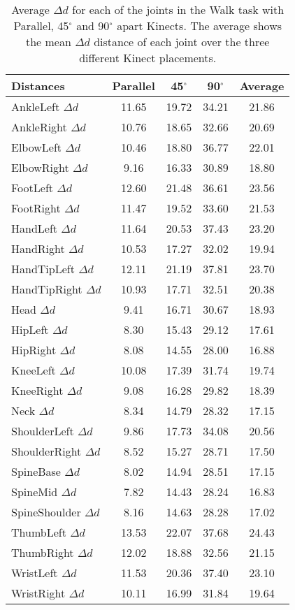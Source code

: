 \begin{table}[!htb]
\centering
\begin{tabularx}{1.0\columnwidth}{||X c c c c||} 
 \hline
 \textbf{Distances} & \textbf{Parallel} & \textbf{45$^{\circ}$} & \textbf{90$^{\circ}$} & \textbf{Average} \\ [0.5ex] 
 \hline\hline
 AnkleLeft $\Delta d$ & 11.65 & 19.72 & 34.21 & 21.86 \\
 \hline
 AnkleRight $\Delta d$ & 10.76 & 18.65 & 32.66 & 20.69 \\
 \hline
 ElbowLeft $\Delta d$ & 10.46 & 18.80 & 36.77 & 22.01 \\
 \hline
 ElbowRight $\Delta d$ & 9.16 & 16.33 & 30.89 & 18.80 \\
 \hline
 FootLeft $\Delta d$ & 12.60 & 21.48 & 36.61 & 23.56 \\
 \hline
 FootRight $\Delta d$ & 11.47 & 19.52 & 33.60 & 21.53 \\
 \hline
 HandLeft $\Delta d$ & 11.64 & 20.53 & 37.43 & 23.20 \\
 \hline
 HandRight $\Delta d$ & 10.53 & 17.27 & 32.02 & 19.94 \\
 \hline
 HandTipLeft $\Delta d$ & 12.11 & 21.19 & 37.81 & 23.70 \\
 \hline
 HandTipRight $\Delta d$ & 10.93 & 17.71 & 32.51 & 20.38 \\
 \hline
 Head $\Delta d$ & 9.41 & 16.71 & 30.67 & 18.93 \\
 \hline
 HipLeft $\Delta d$ & 8.30 & 15.43 & 29.12 & 17.61 \\
 \hline
 HipRight $\Delta d$ & 8.08 & 14.55 & 28.00 & 16.88 \\
 \hline
 KneeLeft $\Delta d$ & 10.08 & 17.39 & 31.74 & 19.74 \\
 \hline
 KneeRight $\Delta d$ & 9.08 & 16.28 & 29.82 & 18.39 \\
 \hline
 Neck $\Delta d$ & 8.34 & 14.79 & 28.32 & 17.15 \\
 \hline
 ShoulderLeft $\Delta d$ & 9.86 & 17.73 & 34.08 & 20.56 \\
 \hline
 ShoulderRight $\Delta d$ & 8.52 & 15.27 & 28.71 & 17.50 \\
 \hline
 SpineBase $\Delta d$ & 8.02 & 14.94 & 28.51 & 17.15 \\
 \hline
 SpineMid $\Delta d$ & 7.82 & 14.43 & 28.24 & 16.83 \\
 \hline
 SpineShoulder $\Delta d$ & 8.16 & 14.63 & 28.28 & 17.02 \\
 \hline
 ThumbLeft $\Delta d$ & 13.53 & 22.07 & 37.68 & 24.43 \\
 \hline
 ThumbRight $\Delta d$ & 12.02 & 18.88 & 32.56 & 21.15 \\
 \hline
 WristLeft $\Delta d$ & 11.53 & 20.36 & 37.40 & 23.10 \\
 \hline
 WristRight $\Delta d$ & 10.11 & 16.99 & 31.84 & 19.64 \\
 \hline
\end{tabularx}
\caption{Average $\Delta d$ for each of the joints in the Walk task with Parallel, 45$^{\circ}$ and 90$^{\circ}$ apart Kinects. The average shows the mean $\Delta d$ distance of each joint over the three different Kinect placements.}
\label{table:walk_joints}
\end{table}

